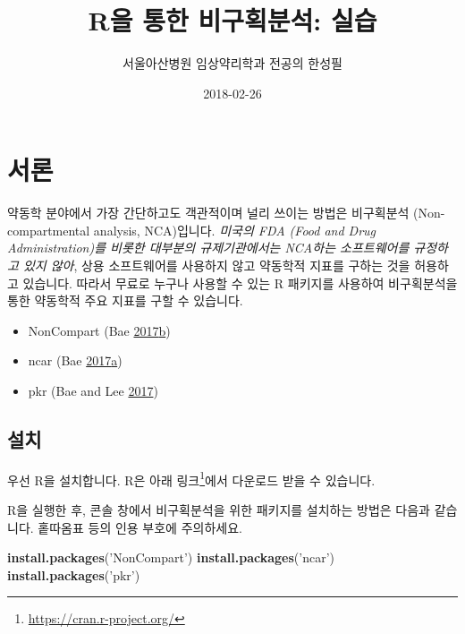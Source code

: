 \documentclass[9pt,]{krantz}
\title{R을 통한 비구획분석: 실습}
\author{서울아산병원 임상약리학과 전공의 한성필}
\date{2018-02-26}
\newenvironment{Shaded}{\begin{snugshade}}{\end{snugshade}}
\newcommand{\KeywordTok}[1]{\textcolor[rgb]{0.13,0.29,0.53}{\textbf{#1}}}
\newcommand{\StringTok}[1]{\textcolor[rgb]{0.31,0.60,0.02}{#1}}
\newcommand{\NormalTok}[1]{#1}
\providecommand{\tightlist}{%
  \setlength{\itemsep}{0pt}\setlength{\parskip}{0pt}}
\begin{document}
\maketitle

{
\hypersetup{linkcolor=black}
\setcounter{tocdepth}{2}
\tableofcontents
}
\mainmatter

\chapter{서론}\label{intro}

약동학 분야에서 가장 간단하고도 객관적이며 널리 쓰이는 방법은 비구획분석
(Non-compartmental analysis, NCA)입니다. \emph{미국의 FDA (Food and Drug
Administration)를 비롯한 대부분의 규제기관에서는 NCA하는 소프트웨어를
규정하고 있지 않아}, 상용 소프트웨어를 사용하지 않고 약동학적 지표를
구하는 것을 허용하고 있습니다. 따라서 무료로 누구나 사용할 수 있는 R
패키지를 사용하여 비구획분석을 통한 약동학적 주요 지표를 구할 수
있습니다.

\begin{itemize}
\tightlist
\item
  NonCompart (Bae
  \protect\hyperlink{ref-R-NonCompart}{2017}\protect\hyperlink{ref-R-NonCompart}{b})
\item
  ncar (Bae
  \protect\hyperlink{ref-R-ncar}{2017}\protect\hyperlink{ref-R-ncar}{a})
\item
  pkr (Bae and Lee \protect\hyperlink{ref-R-pkr}{2017})
\end{itemize}

\section{설치}

우선 R을 설치합니다. R은 아래 링크\footnote{\url{https://cran.r-project.org/}}에서
다운로드 받을 수 있습니다.

R을 실행한 후, 콘솔 창에서 비구획분석을 위한 패키지를 설치하는 방법은
다음과 같습니다. 홑따옴표 등의 인용 부호에 주의하세요.

\begin{Shaded}
\begin{Highlighting}[]
\KeywordTok{install.packages}\NormalTok{(}\StringTok{'NonCompart'}\NormalTok{)}
\KeywordTok{install.packages}\NormalTok{(}\StringTok{'ncar'}\NormalTok{)}
\KeywordTok{install.packages}\NormalTok{(}\StringTok{'pkr'}\NormalTok{)}
\end{Highlighting}
\end{Shaded}
\end{document}
